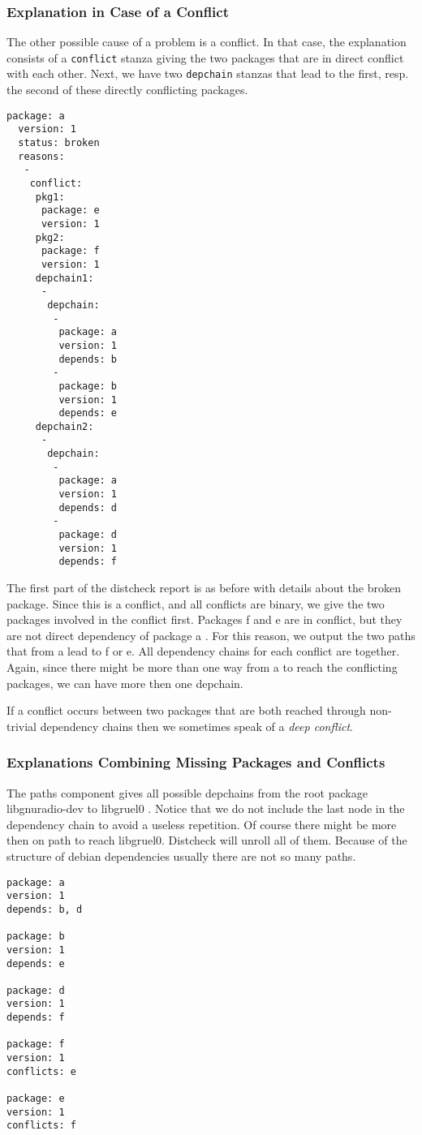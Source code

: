 \subsubsection{Explanation in Case of a Conflict}
The other possible cause of a problem is a conflict. In that case, the
explanation consists of a \texttt{conflict} stanza giving the two
packages that are in direct conflict with each other. Next, we have
two \texttt{depchain} stanzas that lead to the first, resp. the second
of these directly conflicting packages.
\begin{example}
\begin{verbatim}
package: a
  version: 1
  status: broken
  reasons:
   -
    conflict:
     pkg1:
      package: e
      version: 1
     pkg2:
      package: f
      version: 1
     depchain1:
      -
       depchain:
        -
         package: a
         version: 1
         depends: b
        -
         package: b
         version: 1
         depends: e
     depchain2:
      -
       depchain:
        -
         package: a
         version: 1
         depends: d
        -
         package: d
         version: 1
         depends: f
\end{verbatim}
The first part of the distcheck report is as before with details about the
broken package. Since this is a conflict, and all conflicts are binary, we give
the two packages involved in the conflict first. Packages f and e are in
conflict, but they are not direct dependency of package a . For this reason, we
output the two paths that from a lead to f or e. All dependency chains for each
conflict are together. Again, since there might be more than one way from a to
reach the conflicting packages, we can have more then one depchain. 
\end{example}
If a conflict occurs between two packages that are both reached
through non-trivial dependency chains then we sometimes speak of a
\emph{deep conflict}.

\subsubsection{Explanations Combining Missing Packages and Conflicts}
The paths component gives all possible depchains from the root package
libgnuradio-dev to libgruel0 . Notice that we do not include the last node in
the dependency chain to avoid a useless repetition. Of course there might be
more then on path to reach libgruel0. Distcheck will unroll all of them.
Because of the structure of debian dependencies usually there are not so many
paths.

\begin{verbatim}
package: a
version: 1
depends: b, d

package: b
version: 1
depends: e

package: d
version: 1
depends: f

package: f
version: 1
conflicts: e

package: e
version: 1
conflicts: f
\end{verbatim}

